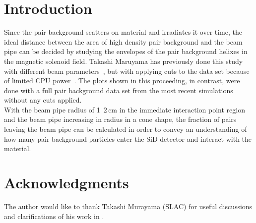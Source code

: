 \documentclass[12pt]{article}
\begin{document}
\section{Introduction}
\label{sec:introduction}
Since the pair background scatters on material and irradiates it over time, the ideal distance between the area of high density pair background and the beam pipe can be decided by studying the envelopes of the pair background helixes in the magnetic solenoid field.
Takashi Maruyama has previously done this study with different beam parameters~\cite{Takashi_plot}, but with applying cuts to the data set because of limited CPU power~\cite{Takashi}.
The plots shown in this proceeding, in contrast, were done with a full pair background data set from the most recent simulations without any cuts applied.\\
With the beam pipe radius of \unit{1.2}\,{cm} in the immediate interaction point region and the beam pipe increasing in radius in a cone shape, the fraction of pairs leaving the beam pipe can be calculated in order to convey an understanding of how many pair background particles enter the SiD detector and interact with the material. 

%
%


\section*{Acknowledgments}
The author would like to thank Takashi Murayama (SLAC) for useful discussions and clarifications of his work in \cite{Takashi_plot}.

%




\end{document}
